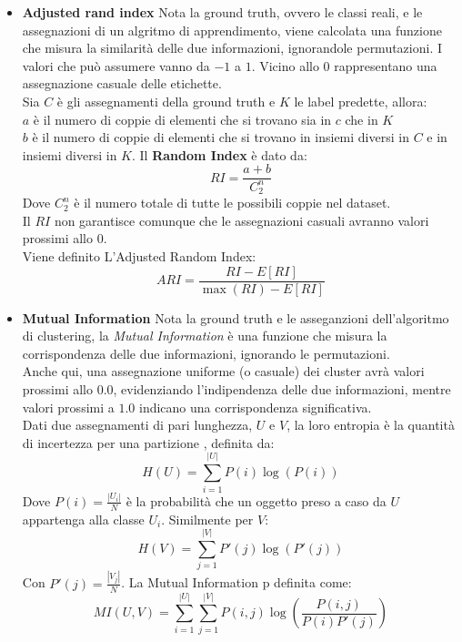 \begin{itemize}
\item \textbf{Adjusted rand index}
Nota la ground truth, ovvero le classi reali, e le assegnazioni di un algritmo di apprendimento, viene calcolata una funzione che misura la similarità delle due informazioni, ignorandole permutazioni. I valori che può assumere vanno da $-1$ a $1$. Vicino allo $0$ rappresentano una assegnazione casuale delle etichette.
\\
Sia $C$ è gli assegnamenti della ground truth e $K$ le label predette, allora:
\\
$a$ è il numero di coppie di elementi che si trovano sia in $c$ che in $K$
\\
$b$ è il numero di coppie di elementi che si trovano in insiemi diversi in $C$ e in insiemi diversi in $K$.
Il \textbf{Random Index} è dato da:
\begin{equation}
RI = \frac{a + b}{C_2^n}
\end{equation}
Dove $C_2^n$ è il numero totale di tutte le possibili coppie nel dataset. 
\\
Il $RI$ non garantisce comunque che le assegnazioni casuali avranno valori prossimi allo $0$.
\\ Viene definito L'Adjusted Random Index:
\begin{equation}
ARI = \frac{RI - E[RI]}{\max (RI) - E[RI]}
\end{equation}

\item \textbf{Mutual Information}
Nota la ground truth e le asseganzioni dell'algoritmo di clustering, la \textit{Mutual Information} è una funzione che misura la corrispondenza delle due informazioni, ignorando le permutazioni. 
\\
Anche qui, una assegnazione uniforme (o casuale) dei cluster avrà valori prossimi allo $0.0$, evidenziando l'indipendenza delle due informazioni, mentre valori prossimi a $1.0$ indicano una corrispondenza significativa.
\\
Dati due assegnamenti di pari lunghezza, $U$ e $V$, la loro entropia è la quantità di incertezza per una partizione , definita da:
\begin{equation}
H(U) = \sum\limits_{i=1}^{|U|} P(i)\log (P(i))
\end{equation}
Dove $P(i) = \frac{|U_i|}{N}$ è la probabilità che un oggetto preso a caso da $U$ appartenga alla classe $U_i$. Similmente per $V$:
\begin{equation}
H(V) = \sum\limits_{j=1}^{|V|} P'(j)\log (P'(j))
\end{equation}
Con $P'(j) = \frac{|V_j|}{N}$. La Mutual Information p definita come:
\begin{equation}
MI(U,V) = \sum\limits_{i=1}^{|U|}\sum\limits_{j=1}^{|V|} P(i,j)\log \left( \frac{P(i,j)}{P(i)P'(j)} \right)
\end{equation}

\end{itemize}


